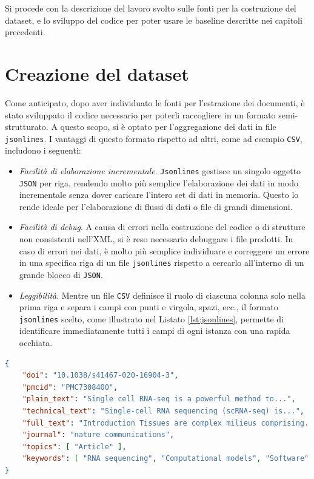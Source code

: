 \documentclass[12pt,a4paper,twoside,openright]{book}
\begin{document}
Si procede con la descrizione del lavoro svolto sulle fonti per la costruzione del dataset, e lo sviluppo del codice per poter usare le baseline descritte nei capitoli precedenti. 

\section{Creazione del dataset}
Come anticipato,  dopo aver individuato le fonti per l'estrazione dei documenti, è stato sviluppato il codice necessario per poterli raccogliere in un formato semi-strutturato. A questo scopo, si è optato per l'aggregazione dei dati in file \texttt{jsonlines}. I vantaggi di questo formato rispetto ad altri, come ad esempio \texttt{CSV}, includono i seguenti:
\begin{itemize}
    \item \emph{Facilità di elaborazione incrementale}. \texttt{Jsonlines} gestisce un singolo oggetto \texttt{JSON} per riga, rendendo molto più semplice l'elaborazione dei dati in modo incrementale senza dover caricare l'intero set di dati in memoria. Questo lo rende ideale per l'elaborazione di flussi di dati o file di grandi dimensioni.
    \item \emph{Facilità di debug}. A causa di errori nella costruzione del codice o di strutture non consistenti nell'XML, si è reso necessario debuggare i file prodotti. In caso di errori nei dati, è molto più semplice individuare e correggere un errore in una specifica riga di un file \texttt{jsonlines} rispetto a cercarlo all'interno di un grande blocco di \texttt{JSON}. 
    \item \emph{Leggibilità}. Mentre un file \texttt{CSV} definisce il ruolo di ciascuna colonna solo nella prima riga e separa i campi con punti e virgola, spazi, ecc., il formato \texttt{jsonlines} scelto, come illustrato nel Listato \ref{lst:jsonlines}, permette di identificare immediatamente tutti i campi di ogni istanza con una rapida occhiata.
\end{itemize}

\begin{lstlisting}[language=json, 
                   caption=Formato jsonlines articoli.,
                   label=lst:jsonlines]
{
    "doi": "10.1038/s41467-020-16904-3", 
    "pmcid": "PMC7308400",  
    "plain_text": "Single cell RNA-seq is a powerful method to...", 
    "technical_text": "Single-cell RNA sequencing (scRNA-seq) is...", 
    "full_text": "Introduction Tissues are complex milieus comprising...", 
    "journal": "nature communications", 
    "topics": [ "Article" ], 
    "keywords": [ "RNA sequencing", "Computational models", "Software" ]
}
\end{lstlisting}
\end{document}
